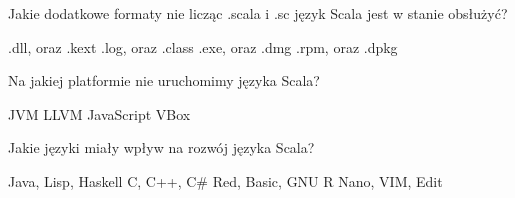 \question[1]
Jakie dodatkowe formaty nie licząc .scala i .sc język Scala jest w stanie obsłużyć?
\begin{choices}
    \choice .dll, oraz .kext
    \CorrectChoice .log, oraz .class
    \choice .exe, oraz .dmg
    \choice .rpm, oraz .dpkg
\end{choices}

\question[2]
Na jakiej platformie nie uruchomimy języka Scala?
\begin{choices}
    \choice JVM
    \choice LLVM
    \choice JavaScript
    \CorrectChoice VBox
\end{choices}

\question[3]
Jakie języki miały wpływ na rozwój języka Scala?
\begin{choices}
    \CorrectChoice Java, Lisp, Haskell
    \choice C, C++, C#
    \choice Red, Basic, GNU R
    \choice Nano, VIM, Edit
\end{choices}